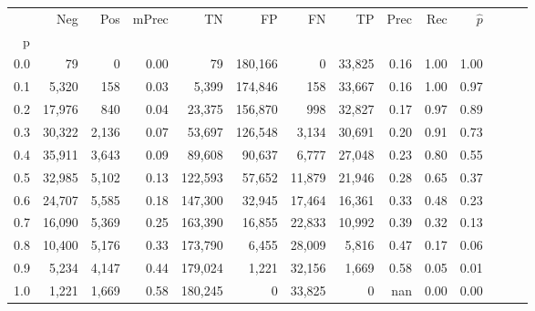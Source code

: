 \begin{tabular}{rrrrrrrrrrrrrr}
\toprule
{} &     Neg &    Pos & mPrec &       TN &       FP &      FN &      TP &  Prec &   Rec & $\hat{p}$ \\
p   &         &        &       &          &          &         &         &       &       &           \\
\midrule
0.0 &      79 &      0 &  0.00 &       79 &  180,166 &       0 &  33,825 &  0.16 &  1.00 &      1.00 \\
0.1 &   5,320 &    158 &  0.03 &    5,399 &  174,846 &     158 &  33,667 &  0.16 &  1.00 &      0.97 \\
0.2 &  17,976 &    840 &  0.04 &   23,375 &  156,870 &     998 &  32,827 &  0.17 &  0.97 &      0.89 \\
0.3 &  30,322 &  2,136 &  0.07 &   53,697 &  126,548 &   3,134 &  30,691 &  0.20 &  0.91 &      0.73 \\
0.4 &  35,911 &  3,643 &  0.09 &   89,608 &   90,637 &   6,777 &  27,048 &  0.23 &  0.80 &      0.55 \\
0.5 &  32,985 &  5,102 &  0.13 &  122,593 &   57,652 &  11,879 &  21,946 &  0.28 &  0.65 &      0.37 \\
0.6 &  24,707 &  5,585 &  0.18 &  147,300 &   32,945 &  17,464 &  16,361 &  0.33 &  0.48 &      0.23 \\
0.7 &  16,090 &  5,369 &  0.25 &  163,390 &   16,855 &  22,833 &  10,992 &  0.39 &  0.32 &      0.13 \\
0.8 &  10,400 &  5,176 &  0.33 &  173,790 &    6,455 &  28,009 &   5,816 &  0.47 &  0.17 &      0.06 \\
0.9 &   5,234 &  4,147 &  0.44 &  179,024 &    1,221 &  32,156 &   1,669 &  0.58 &  0.05 &      0.01 \\
1.0 &   1,221 &  1,669 &  0.58 &  180,245 &        0 &  33,825 &       0 &   nan &  0.00 &      0.00 \\
\bottomrule
\end{tabular}

